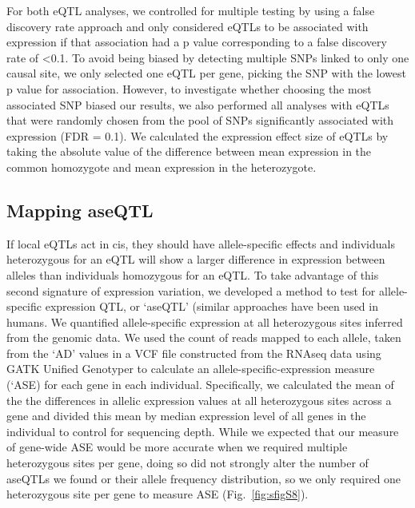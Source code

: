 For both eQTL analyses, we controlled for multiple testing by using a false discovery rate approach \citep{Storey} and only considered eQTLs to be associated with expression if that association had a p value corresponding to a false discovery rate of <0.1. To avoid being biased by detecting multiple SNPs linked to only one causal site, we only selected one eQTL per gene, picking the SNP with the lowest p value for association. However, to investigate whether choosing the most associated SNP biased our results, we also performed all analyses with eQTLs that were randomly chosen from the pool of SNPs significantly associated with expression (FDR = 0.1). We calculated the expression effect size of eQTLs by taking the absolute value of the difference between mean expression in the common homozygote and mean expression in the heterozygote. 

\subsection{Mapping aseQTL}
If local eQTLs act in cis, they should have allele-specific effects and individuals heterozygous for an eQTL will show a larger difference in expression between alleles than individuals homozygous for an eQTL. To take advantage of this second signature of expression variation, we developed a method to test for allele-specific expression QTL, or ‘aseQTL’ (similar approaches have been used in humans\citep{Battle2014-ke}. We quantified allele-specific expression at all heterozygous sites inferred from the genomic data. We used the count of reads mapped to each allele, taken from the ‘AD’ values in a VCF file constructed from the RNAseq data using GATK Unified Genotyper to calculate an allele-specific-expression measure (‘ASE) for each gene in each individual. Specifically, we calculated the mean of the the differences in allelic expression values at all heterozygous sites across a gene and divided this mean by median expression level of all genes in the individual to control for sequencing depth. While we expected that our measure of gene-wide ASE would be more accurate when we required multiple heterozygous sites per gene, doing so did not strongly alter the number of aseQTLs we found or their allele frequency distribution, so we only required one heterozygous site per gene to measure ASE (Fig.~\ref{fig:sfigS8}).

